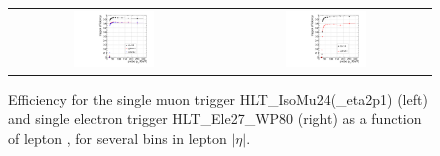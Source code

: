 \begin{figure}[!ht]
\begin{center}
\begin{tabular}{cc}
\includegraphics[width=0.4\textwidth]{plots/mutrig_pt_etabins.pdf} &
\includegraphics[width=0.4\textwidth]{plots/eltrig_pt_etabins.pdf} \\
\end{tabular}
\caption{\label{fig:trigeff}
Efficiency for the single muon trigger HLT\_IsoMu24(\_eta2p1) (left) and single electron trigger HLT\_Ele27\_WP80 (right) as a function of lepton \pt,
for several bins in lepton $|\eta|$.
}
\end{center}
\end{figure}

\clearpage

